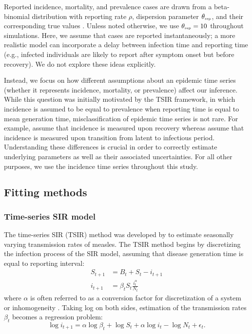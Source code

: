 \documentclass{article}
\newcommand{\tsub}[2]{#1_{{\textrm{\tiny #2}}}}
\begin{document}
Reported incidence, mortality, and prevalence cases are drawn from a beta-binomial distribution with reporting rate $\rho$, dispersion parameter $\tsub{\theta}{rep}$, and their corresponding true values \citep{morris1997disentangling}.
Unless noted otherwise, we use $\tsub{\theta}{rep} = 10$ throughout simulations.
Here, we assume that cases are reported instantaneously; 
a more realistic model can incorporate a delay between infection time and reporting time (e.g., infected individuals are likely to report after symptom onset but before recovery).
We do not explore these ideas explicitly.

Instead, we focus on how different assumptions about an epidemic time series (whether it represents incidence, mortality, or prevalence) affect our inference.
While this question was initially motivated by the TSIR framework, in which incidence is assumed to be equal to prevalence when reporting time is equal to mean generation time, 
misclassification of epidemic time series is not rare.
For example, \cite{he2009plug} assume that incidence is measured upon recovery whereas \cite{hooker2010parameterizing, althaus2014estimating} assume that incidence is measured upon transition from latent to infectious period.
Understanding these differences is crucial in order to correctly estimate underlying parameters as well as their associated uncertainties.
For all other purposes, we use the incidence time series throughout this study.

\subsection{Fitting methods}

\subsubsection*{Time-series SIR model}

The time-series SIR (TSIR) method was developed by \cite{finkenstadt2000time} to estimate seasonally varying transmission rates of measles.
The TSIR method begins by discretizing the infection process of the SIR model, assuming that disease generation time is equal to reporting interval:
\begin{equation}\label{eq:tsir_dynamics}
\begin{aligned}
S_{t+1} &= B_t + S_t - i_{t+1}\\
i_{t+1} &= \beta_t S_t \frac{i_t^\alpha}{N_t}
\end{aligned}
\end{equation}
where $\alpha$ is often referred to as a conversion factor for discretization of a system or inhomogeneity \citep{liu1986influence, bjornstad2002dynamics, glass2003interpreting}.
Taking log on both sides, estimation of the transmission rates $\beta_t$ becomes a regression problem:
\begin{equation}\label{eq:tsir}
\log i_{t + 1} = \alpha \log \beta_t + \log S_t + \alpha \log i_t - \log N_t + \epsilon_t.
\end{equation}
\end{document}
